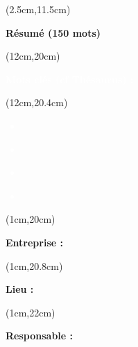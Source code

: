 \begin{titlepage}
    \begin{textblock*}{16cm}(2.5cm,11.5cm)
        \makeatletter
        \noindent
        \normalsize
        \selectfont
        \begin{center}
            \textbf{\textcolor{bleuRoiUTT}{Résumé (150 mots)}}
        \end{center}
        \begin{flushleft}
            \justifying
            \titletext
        \end{flushleft}
        \makeatother
    \end{textblock*}

    \begin{textblock*}{7.8cm}(12cm,20cm)
        \normalsize
        \begin{center}
            \textbf{\textcolor{white}{Mots clés (cf Thésaurus) :}}
        \end{center}
    \end{textblock*}

    \begin{textblock*}{10cm}(12cm,20.4cm)
        \small
        \begin{flushleft}
            \textcolor{white}{
                \begin{itemize}[label=\textcolor{white}{\textbullet}]
                    \item \textbf{\theKone}
                    \item \textbf{\theKtwo}
                    \item \textbf{\theKthree}
                    \item \textbf{\theKfourth}
                \end{itemize}
            }
        \end{flushleft}
    \end{textblock*}

    \begin{textblock*}{7.8cm}(1cm,20cm)
        \normalsize
        \begin{flushleft}
            \textbf{\textcolor{bleuRoiUTT}{Entreprise :} \theEntreprise}
        \end{flushleft}
    \end{textblock*}

    \begin{textblock*}{7.8cm}(1cm,20.8cm)
        \normalsize
        \begin{flushleft}
            \textbf{\textcolor{bleuRoiUTT}{Lieu :} \textit{\mapAddr{\theLieu}}}
        \end{flushleft}
    \end{textblock*}

    \begin{textblock*}{7.8cm}(1cm,22cm)
        \normalsize
        \begin{flushleft}
            \textbf{\textcolor{bleuRoiUTT}{Responsable :} \theREntre}
        \end{flushleft}
    \end{textblock*}

\end{titlepage}

\clearpage %